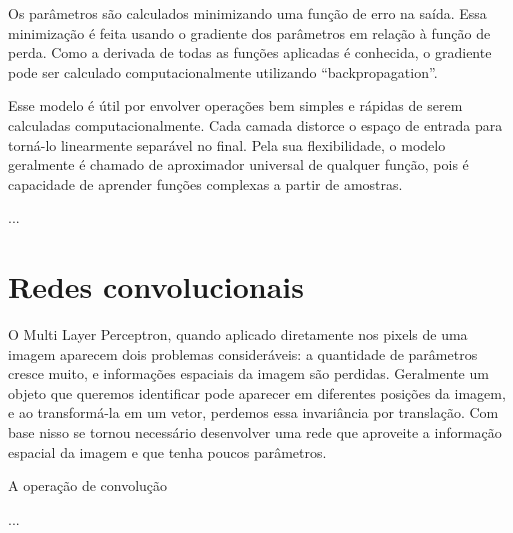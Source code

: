 
Os parâmetros são calculados minimizando
uma função de erro na saída. Essa minimização
é feita usando o gradiente dos parâmetros
em relação à função de perda. Como a derivada
de todas as funções aplicadas é conhecida,
o gradiente pode ser calculado computacionalmente
utilizando ``backpropagation''.




Esse modelo é útil por envolver operações
bem simples e rápidas de serem calculadas
computacionalmente. Cada camada distorce
o espaço de entrada para torná-lo linearmente
separável no final. Pela sua flexibilidade,
o modelo geralmente é chamado de aproximador 
universal de qualquer função, pois
é capacidade de aprender funções complexas
a partir de amostras.


...

\section{Redes convolucionais}



O Multi Layer Perceptron,
quando aplicado diretamente
nos pixels de uma imagem aparecem
dois problemas consideráveis:
a quantidade de parâmetros cresce muito,
e informações espaciais da imagem
são perdidas. Geralmente um objeto
que queremos identificar pode aparecer
em diferentes posições da imagem,
e ao transformá-la em um vetor,
perdemos essa invariância por translação.
Com base nisso se tornou necessário
desenvolver uma rede que aproveite
a informação espacial da imagem
e que tenha poucos parâmetros.


A operação de convolução

...



